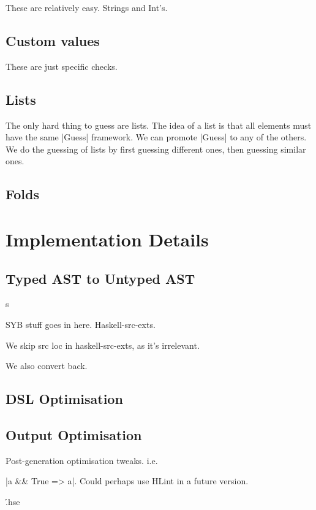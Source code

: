 \documentclass[preprint]{sigplanconf}
\begin{document}
These are relatively easy. Strings and Int's.

\subsection{Custom values}

These are just specific checks.

\subsection{Lists}

The only hard thing to guess are lists. The idea of a list is that all elements must have the same |Guess| framework. We can promote |Guess| to any of the others. We do the guessing of lists by first guessing different ones, then guessing similar ones.

\subsection{Folds}


\section{Implementation Details}
\label{sec:implementation}

\subsection{Typed AST to Untyped AST}s
\label{sec:universe}

SYB stuff goes in here. Haskell-src-exts.

We skip src loc in haskell-src-exts, as it's irrelevant.

We also convert back.

\subsection{DSL Optimisation}

\subsection{Output Optimisation}
\label{sec:simplify}

Post-generation optimisation tweaks. i.e. \ignore|a && True => a|. Could perhaps use HLint in a future version.

\h{.hse}
\end{document}
